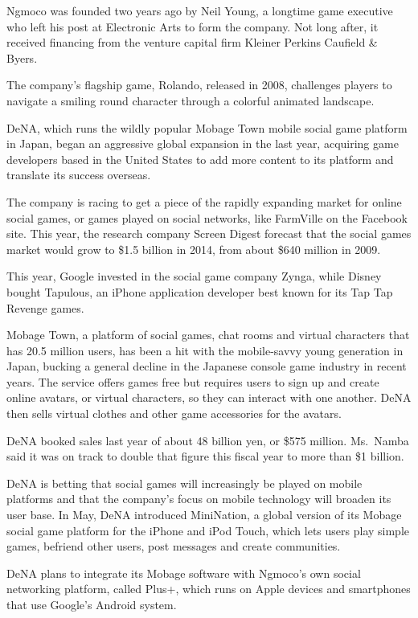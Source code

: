 ﻿\documentclass[12pt]{article}
\begin{document}
Ngmoco was founded two years ago by Neil Young, a longtime game executive who left his post at
Electronic Arts to form the company. Not long after, it received financing from the venture capital
firm Kleiner Perkins Caufield \& Byers.

The company's flagship game, Rolando, released in 2008, challenges players to navigate a smiling
round character through a colorful animated landscape.

DeNA, which runs the wildly popular Mobage Town mobile social game platform in Japan, began an
aggressive global expansion in the last year, acquiring game developers based in the United States
to add more content to its platform and translate its success overseas.

The company is racing to get a piece of the rapidly expanding market for online social games, or
games played on social networks, like FarmVille on the Facebook site. This year, the research
company Screen Digest forecast that the social games market would grow to \$1.5 billion in 2014,
from about \$640 million in 2009.

This year, Google invested in the social game company Zynga, while Disney bought Tapulous, an iPhone
application developer best known for its Tap Tap Revenge games.

Mobage Town, a platform of social games, chat rooms and virtual characters that has 20.5 million
users, has been a hit with the mobile-savvy young generation in Japan, bucking a general decline in
the Japanese console game industry in recent years. The service offers games free but requires users
to sign up and create online avatars, or virtual characters, so they can interact with one another.
DeNA then sells virtual clothes and other game accessories for the avatars.

DeNA booked sales last year of about 48 billion yen, or \$575 million. Ms.~Namba said it was on
track to double that figure this fiscal year to more than \$1 billion.

DeNA is betting that social games will increasingly be played on mobile platforms and that the
company's focus on mobile technology will broaden its user base. In May, DeNA introduced MiniNation,
a global version of its Mobage social game platform for the iPhone and iPod Touch, which lets users
play simple games, befriend other users, post messages and create communities.

DeNA plans to integrate its Mobage software with Ngmoco's own social networking platform, called
Plus+, which runs on Apple devices and smartphones that use Google's Android system.
\end{document}
